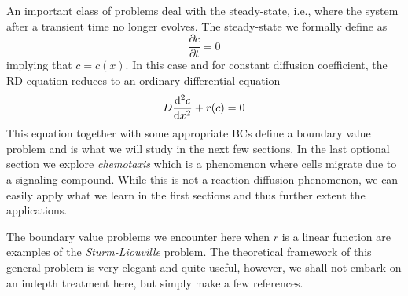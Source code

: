 
An important class of problems deal with the steady-state, i.e., where the
system after a transient time no longer evolves. The steady-state we formally
define as  
\begin{equation}
  \frac{\partial c}{\partial t}=0 
\end{equation}
implying that $c=c(x)$. In this case and for constant diffusion coefficient,
the RD-equation reduces to an ordinary differential equation
\begin{equation}
  D\frac{\mathrm{d}^2c}{\mathrm{d} x^2} + r(c)=0  
\end{equation}
This equation together with some appropriate BCs 
define a boundary value problem and is what we will study in the next few
sections. In the last optional section we explore \emph{chemotaxis} which is a phenomenon where 
cells migrate due to a signaling compound. While this is not a 
reaction-diffusion phenomenon, we can easily apply what we 
learn in the first sections and thus further extent the applications.

The boundary value problems we encounter here when $r$ is a linear function 
are examples of the \emph{Sturm-Liouville} problem. The theoretical 
framework of this general problem is very elegant and quite useful, however, we shall 
not embark on an indepth treatment here, but simply make a few references. 


